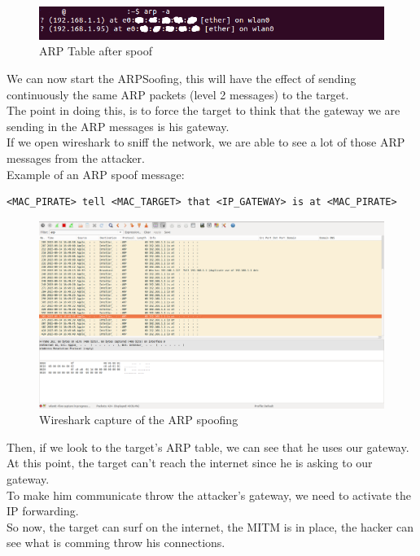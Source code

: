 \documentclass[a4paper, 11pt, oneside]{article}
\begin{document}
\begin{figure}[!h]
	\centering
	\includegraphics[scale=0.75]{../images/arpTableAfterSpoof.png}
	\caption{ARP Table after spoof}
	\label{ARP_after_spoof}
\end{figure}
We can now start the ARPSoofing, this will have the effect of sending continuously the same ARP packets (level 2 messages) to the target.\\
The point in doing this, is to force the target to think that the gateway we are sending in the ARP messages is his gateway.\\
If we open wireshark to sniff the network, we are able to see a lot of those ARP messages from the attacker.\\

Example of an ARP spoof message: 
\begin{center}
\begin{verbatim}
<MAC_PIRATE> tell <MAC_TARGET> that <IP_GATEWAY> is at <MAC_PIRATE>
\end{verbatim}
\end{center}

\begin{figure}[!h]
	\centering
	\includegraphics[scale=0.3]{../images/wiresharArpSpoof.png}
	\caption{Wireshark capture of the ARP spoofing}
	\label{Wireshark_ARP_Spoof}
\end{figure}

Then, if we look to the target's ARP table, we can see that he uses our gateway.\\
At this point, the target can't reach the internet since he is asking to our gateway.\\
To make him communicate throw the attacker's gateway, we need to activate the IP forwarding.\\
So now, the target can surf on the internet, the MITM is in place, the hacker can see what is comming throw his connections.\\
\end{document}
